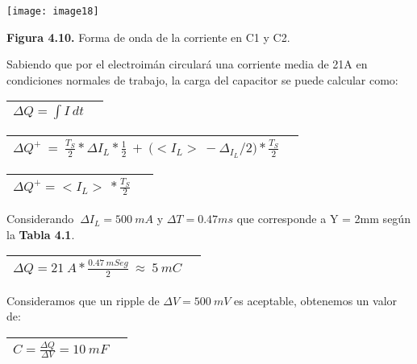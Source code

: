\documentclass{article} %
\begin{document}
\noindent 

\noindent \texttt{[image: image18]}

\noindent \textbf{Figura 4.10. }Forma de onda de la corriente en C1 y C2.

\noindent \textbf{}

\noindent Sabiendo que por el electroim\'{a}n circular\'{a} una corriente media de 21A en condiciones normales de trabajo, la carga del capacitor se puede calcular como:

\noindent 

\begin{tabular}{|p{3.9in}|p{0.4in}|} \hline 
$\mathit{\Delta}Q=\int I\ dt$ &  \\ \hline 
\end{tabular}



\begin{tabular}{|p{3.9in}|p{0.4in}|} \hline 
${\mathit{\Delta}Q^+\ =\ \frac{T_S}{2}*{\mathit{\Delta}I}_L*\frac{1}{2}\ +\ (}{<I}_L>\ -{\mathit{\Delta}}_{I_L}/2)*\frac{T_S}{2}$ &  \\ \hline 
\end{tabular}



\begin{tabular}{|p{3.9in}|p{0.4in}|} \hline 
$\mathit{\Delta}Q^+={<I}_L>\ *\frac{T_S}{2}\ $ &  \\ \hline 
\end{tabular}



\noindent Considerando $\ {\mathit{\Delta}I}_L=500\ m$$A$ y $\mathit{\Delta}T=0.47ms$ que corresponde a Y = 2mm seg\'{u}n la \textbf{Tabla 4.1}.

\noindent 

\begin{tabular}{|p{3.9in}|p{0.4in}|} \hline 
$\mathit{\Delta}Q=21\ A*\frac{0.47\ mSeg}{2}\ \approx \ 5\ mC$ &  \\ \hline 
\end{tabular}



\noindent Consideramos que un ripple de $\mathit{\Delta}V=500\ mV$ es aceptable, obtenemos un valor de:

\noindent 

\begin{tabular}{|p{3.9in}|p{0.5in}|} \hline 
$C=\frac{\mathit{\Delta}Q}{\mathit{\Delta}V}=10\ mF$  &  \\ \hline 
\end{tabular}
\end{document}
